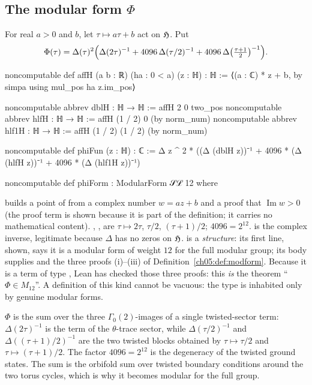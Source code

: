 \subsection{The modular form \texorpdfstring{$\Phi$}{Phi}}

\begin{definition}\label{ch05:def:phi}
For real $a>0$ and $b$, let $\tau\mapsto a\tau+b$ act on $\mathfrak{H}$. Put
\begin{equation*}
  \Phi(\tau) = \Delta(\tau)^2\Bigl(\Delta(2\tau)^{-1} + 4096\,\Delta(\tau/2)^{-1} + 4096\,\Delta\bigl(\tfrac{\tau+1}2\bigr)^{-1}\Bigr).
\end{equation*}
\end{definition}
\begin{leancode}
noncomputable def affH (a b : ℝ) (ha : 0 < a) (z : ℍ) : ℍ :=
  ⟨(a : ℂ) * z + b, by simpa using mul_pos ha z.im_pos⟩

noncomputable abbrev dblH : ℍ → ℍ := affH 2 0 two_pos
noncomputable abbrev hlfH : ℍ → ℍ := affH (1 / 2) 0 (by norm_num)
noncomputable abbrev hlf1H : ℍ → ℍ := affH (1 / 2) (1 / 2) (by norm_num)

noncomputable def phiFun (z : ℍ) : ℂ :=
  Δ z ^ 2 * ((Δ (dblH z))⁻¹ + 4096 * (Δ (hlfH z))⁻¹ + 4096 * (Δ (hlf1H z))⁻¹)

noncomputable def phiForm : ModularForm 𝒮ℒ 12 where
\end{leancode}
\begin{dictionary}
 builds a point of  from a complex number $w = a z + b$ and a proof that
$\operatorname{Im} w>0$ (the proof term is shown because it is part of the definition; it carries no
mathematical content). , ,  are $\tau\mapsto2\tau$, $\tau/2$,
$(\tau+1)/2$; $4096 = 2^{12}$.  is the complex inverse, legitimate because $\Delta$ has no
zeros on $\mathfrak{H}$.  is a \emph{structure}: its first line, shown, says it is a modular
form of weight $12$ for the full modular group; its body supplies  and the three
proofs (i)--(iii) of Definition~\ref{ch05:def:modform}. Because it is a term of type
, Lean has checked those three proofs: this \emph{is} the theorem ``$\Phi\in
M_{12}$''. A definition of this kind cannot be vacuous: the type  is inhabited
only by genuine modular forms.
\end{dictionary}

\begin{physics}
$\Phi$ is the sum over the three $\Gamma_0(2)$-images of a single twisted-sector term: $\Delta(2\tau)^{-1}$ is the term of the $\theta$-trace sector, while $\Delta(\tau/2)^{-1}$ and $\Delta((\tau+1)/2)^{-1}$ are the two twisted blocks obtained by $\tau\mapsto\tau/2$ and $\tau\mapsto(\tau+1)/2$. The factor $4096=2^{12}$ is the degeneracy of the twisted ground states. The sum is the orbifold sum over twisted boundary conditions around the two torus cycles, which is why it becomes modular for the full group.
\end{physics}

